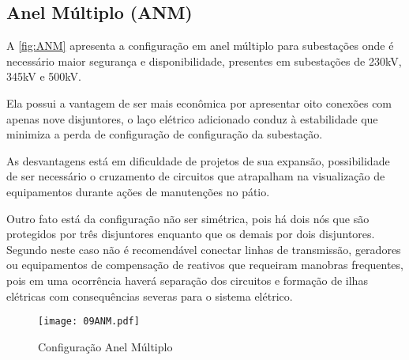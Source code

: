 		\subsection{Anel Múltiplo (ANM)}
			A \autoref{fig:ANM} apresenta a configuração em anel múltiplo para subestações onde é necessário maior segurança e disponibilidade, presentes em subestações de 230kV, 345kV e 500kV.\par
			Ela possui a vantagem de ser mais econômica por apresentar oito conexões com apenas nove disjuntores, o laço elétrico adicionado conduz à estabilidade que minimiza a perda de configuração de configuração da subestação.\par
			As desvantagens está em dificuldade de projetos de sua expansão, possibilidade de ser necessário o cruzamento de circuitos que atrapalham na visualização de equipamentos durante ações de manutenções no pátio.\par
			Outro fato está da configuração não ser simétrica, pois há dois nós que são protegidos por três disjuntores enquanto que os demais por dois disjuntores. Segundo  neste caso não é recomendável conectar linhas de transmissão, geradores ou equipamentos de compensação de reativos que requeiram manobras frequentes, pois em uma ocorrência haverá separação dos circuitos e formação de ilhas elétricas com consequências severas para o sistema elétrico.\par
			\begin{figure}[!htb]
				\caption{Configuração Anel Múltiplo}
				\centering
				\texttt{[image: 09ANM.pdf]}
				\label{fig:ANM}
				\end{figure}
